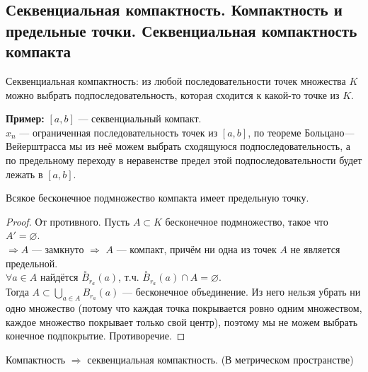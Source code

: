 \subsection{Секвенциальная компактность. Компактность и предельные точки. Секвенциальная компактность компакта \href{https://youtu.be/IwHCWoW4oes?t=2678}{\Walley}}

\begin{conj}
    Секвенциальная компактность: из любой последовательности точек множества
    $K$ можно выбрать подпоследовательность, которая сходится к какой-то точке из $K$.
\end{conj}

\textbf{Пример:}
    $[a,b]$ --- секвенциальный компакт. \\
    $x_n$ --- ограниченная последовательность точек из $[a,b]$, по теореме
    Больцано—Вейерштрасса мы из неё можем выбрать сходящуюся подпоследовательность, а
    по предельному переходу в неравенстве предел этой подпоследовательности будет лежать в $[a,b]$.
    
\begin{theorem-non}
    Всякое бесконечное подмножество компакта имеет предельную точку.

    \begin{proof}
        От противного. Пусть $A \subset K$ бесконечное подмножество, такое что $A' = \varnothing$. \\
        $\Longrightarrow A$ --- замкнуто $\Longrightarrow$ $A$ --- компакт, причём ни одна из точек $A$ не является предельной. \\
        $\forall a \in A$ найдётся $\overset{\circ}{B}_{r_a}(a)$, т.ч. $\overset{\circ}{B}_{r_a}(a) \cap A = \varnothing$. \\
        Тогда $A \subset \bigcup\limits_{a\in A} B_{r_a}(a)$ --- бесконечное объединение.
        Из него нельзя убрать ни одно множество (потому что каждая точка покрывается ровно одним множеством, каждое множество покрывает только свой центр), поэтому мы не можем выбрать конечное подпокрытие. Противоречие.
    \end{proof}

\end{theorem-non}
    
\follow \; Компактность $\Longrightarrow$ секвенциальная компактность. (В метрическом пространстве)

